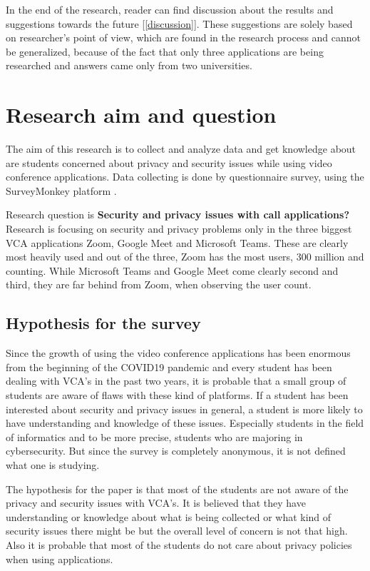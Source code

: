 \documentclass[utf8,english]{gradu3}
\begin{document}
%
In the end of the research, reader can find discussion about the results and suggestions towards the future [\ref{discussion}]. These suggestions are solely based on researcher's point of view, which are found in the research process and cannot be generalized, because of the fact that only three applications are being researched and answers came only from two universities.


\chapter{Research aim and question}
\label{researchquestion}
The aim of this research is to collect and analyze data and get knowledge about are students concerned about privacy and security issues while using video conference applications. Data collecting is done by questionnaire survey, using the SurveyMonkey platform \parencite{apina}.

Research question is \textbf{Security and privacy issues with call applications?}
Research is focusing on security and privacy problems only in the three biggest VCA applications Zoom, Google Meet and Microsoft Teams. These are clearly most heavily used and out of the three, Zoom has the most users, 300 million and counting. While Microsoft Teams and Google Meet come clearly second and third, they are far behind from Zoom, when observing the user count.

\section{Hypothesis for the survey}
Since the growth of using the video conference applications has been enormous from the beginning of the COVID19 pandemic and every student has been dealing with VCA's in the past two years, it is probable that a small group of students are aware of flaws with these kind of platforms. If a student has been interested about security and privacy issues in general, a student is more likely to have understanding and knowledge of these issues. Especially students in the field of informatics and to be more precise, students who are majoring in cybersecurity. But since the survey is completely anonymous, it is not defined what one is studying.

The hypothesis for the paper is that most of the students are not aware of the privacy and security issues with VCA's. It is believed that they have understanding or knowledge about what is being collected or what kind of security issues there might be but the overall level of concern is not that high. Also it is probable that most of the students do not care about privacy policies when using applications.
\end{document}
